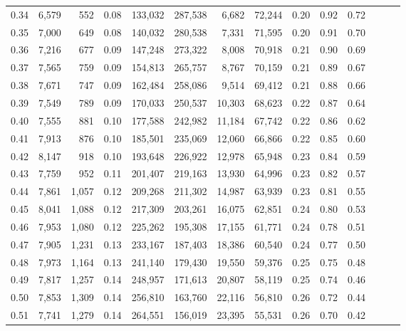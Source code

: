 \begin{tabular}{rrrrrrrrrrrrrr}
0.34 &   6,579 &    552 &  0.08 &  133,032 &  287,538 &   6,682 &  72,244 &  0.20 &  0.92 &      0.72 \\
0.35 &   7,000 &    649 &  0.08 &  140,032 &  280,538 &   7,331 &  71,595 &  0.20 &  0.91 &      0.70 \\
0.36 &   7,216 &    677 &  0.09 &  147,248 &  273,322 &   8,008 &  70,918 &  0.21 &  0.90 &      0.69 \\
0.37 &   7,565 &    759 &  0.09 &  154,813 &  265,757 &   8,767 &  70,159 &  0.21 &  0.89 &      0.67 \\
0.38 &   7,671 &    747 &  0.09 &  162,484 &  258,086 &   9,514 &  69,412 &  0.21 &  0.88 &      0.66 \\
0.39 &   7,549 &    789 &  0.09 &  170,033 &  250,537 &  10,303 &  68,623 &  0.22 &  0.87 &      0.64 \\
0.40 &   7,555 &    881 &  0.10 &  177,588 &  242,982 &  11,184 &  67,742 &  0.22 &  0.86 &      0.62 \\
0.41 &   7,913 &    876 &  0.10 &  185,501 &  235,069 &  12,060 &  66,866 &  0.22 &  0.85 &      0.60 \\
0.42 &   8,147 &    918 &  0.10 &  193,648 &  226,922 &  12,978 &  65,948 &  0.23 &  0.84 &      0.59 \\
0.43 &   7,759 &    952 &  0.11 &  201,407 &  219,163 &  13,930 &  64,996 &  0.23 &  0.82 &      0.57 \\
0.44 &   7,861 &  1,057 &  0.12 &  209,268 &  211,302 &  14,987 &  63,939 &  0.23 &  0.81 &      0.55 \\
0.45 &   8,041 &  1,088 &  0.12 &  217,309 &  203,261 &  16,075 &  62,851 &  0.24 &  0.80 &      0.53 \\
0.46 &   7,953 &  1,080 &  0.12 &  225,262 &  195,308 &  17,155 &  61,771 &  0.24 &  0.78 &      0.51 \\
0.47 &   7,905 &  1,231 &  0.13 &  233,167 &  187,403 &  18,386 &  60,540 &  0.24 &  0.77 &      0.50 \\
0.48 &   7,973 &  1,164 &  0.13 &  241,140 &  179,430 &  19,550 &  59,376 &  0.25 &  0.75 &      0.48 \\
0.49 &   7,817 &  1,257 &  0.14 &  248,957 &  171,613 &  20,807 &  58,119 &  0.25 &  0.74 &      0.46 \\
0.50 &   7,853 &  1,309 &  0.14 &  256,810 &  163,760 &  22,116 &  56,810 &  0.26 &  0.72 &      0.44 \\
0.51 &   7,741 &  1,279 &  0.14 &  264,551 &  156,019 &  23,395 &  55,531 &  0.26 &  0.70 &      0.42 \\

\end{tabular}
